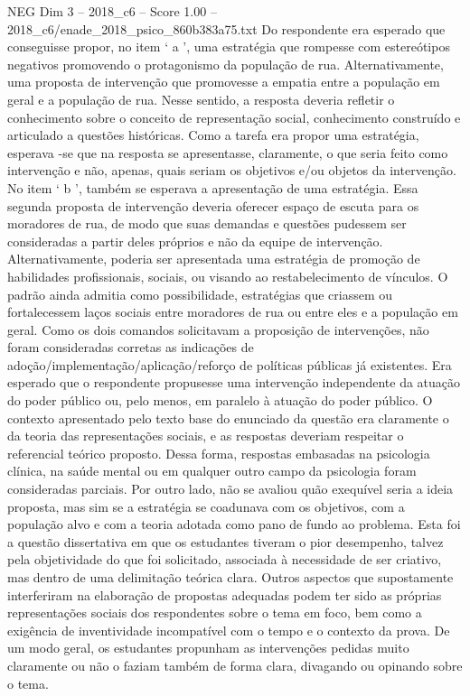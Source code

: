 \begin{textsample}{NEG Dim 3 – 2018\_c6 – Score 1.00 – 2018\_c6/enade\_2018\_psico\_860b383a75.txt}
Do respondente era esperado que conseguisse propor, no item ‘ a ’, uma estratégia que rompesse com estereótipos negativos promovendo o protagonismo da população de rua.
Alternativamente, uma proposta de intervenção que promovesse a empatia entre a população em geral e a população de rua.
Nesse sentido, a resposta deveria refletir o conhecimento sobre o conceito de representação social, conhecimento construído e articulado a questões históricas.
Como a tarefa era propor uma estratégia, esperava -se que na resposta se apresentasse, claramente, o que seria feito como intervenção e não, apenas, quais seriam os objetivos e/ou objetos da intervenção.
No item ‘ b ’, também se esperava a apresentação de uma estratégia.
Essa segunda proposta de intervenção deveria oferecer espaço de escuta para os moradores de rua, de modo que suas demandas e questões pudessem ser consideradas a partir deles próprios e não da equipe de intervenção.
Alternativamente, poderia ser apresentada uma estratégia de promoção de habilidades profissionais, sociais, ou visando ao restabelecimento de vínculos.
O padrão ainda admitia como possibilidade, estratégias que criassem ou fortalecessem laços sociais entre moradores de rua ou entre eles e a população em geral.
Como os dois comandos solicitavam a proposição de intervenções, não foram consideradas corretas as indicações de adoção/implementação/aplicação/reforço de políticas públicas já existentes.
Era esperado que o respondente propusesse uma intervenção independente da atuação do poder público ou, pelo menos, em paralelo à atuação do poder público.
O contexto apresentado pelo texto base do enunciado da questão era claramente o da teoria das representações sociais, e as respostas deveriam respeitar o referencial teórico proposto.
Dessa forma, respostas embasadas na psicologia clínica, na saúde mental ou em qualquer outro campo da psicologia foram consideradas parciais.
Por outro lado, não se avaliou quão exequível seria a ideia proposta, mas sim se a estratégia se coadunava com os objetivos, com a população alvo e com a teoria adotada como pano de fundo ao problema.
Esta foi a questão dissertativa em que os estudantes tiveram o pior desempenho, talvez pela objetividade do que foi solicitado, associada à necessidade de ser criativo, mas dentro de uma delimitação teórica clara.
Outros aspectos que supostamente interferiram na elaboração de propostas adequadas podem ter sido as próprias representações sociais dos respondentes sobre o tema em foco, bem como a exigência de inventividade incompatível com o tempo e o contexto da prova.
De um modo geral, os estudantes propunham as intervenções pedidas muito claramente ou não o faziam também de forma clara, divagando ou opinando sobre o tema.

\end{textsample}
